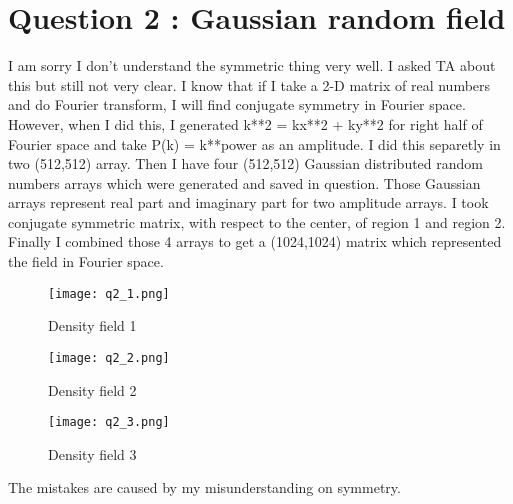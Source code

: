 \section{Question 2 : Gaussian random field}
I am sorry I don't understand the symmetric thing very well. I asked TA about this but still not very clear. I know that if I take a 2-D matrix of real numbers and do Fourier transform, I will find conjugate symmetry in Fourier space. However, when I did this, I generated k**2 = kx**2 + ky**2 for right half of Fourier space and take P(k) = k**power as an amplitude. I did this separetly in two (512,512) array. 
Then I have four (512,512) Gaussian distributed random numbers arrays which were generated and saved in question.
Those Gaussian arrays represent real part and imaginary part for two amplitude arrays. I took conjugate symmetric matrix, with respect to the center, of region 1 and region 2. Finally I combined those 4 arrays to get a (1024,1024) matrix which represented 
the field in Fourier space.



\begin{figure}[h!]
  \centering
  \texttt{[image: q2\_1.png]}
  \caption{Density field 1}
  \label{fig:q2_1} 
\end{figure}

\begin{figure}[h!]
  \centering
  \texttt{[image: q2\_2.png]}
  \caption{Density field 2}
  \label{fig:q2_2} 
\end{figure}


\begin{figure}[h!]
  \centering
  \texttt{[image: q2\_3.png]}
  \caption{Density field 3}
  \label{fig:q2_3} 
\end{figure}

The mistakes are caused by my misunderstanding on symmetry.
